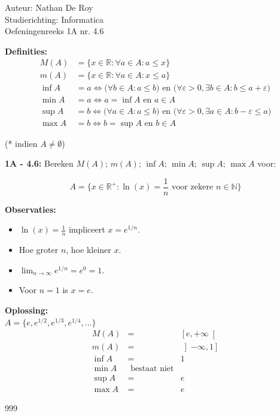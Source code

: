 \documentclass[a4paper]{article}
\begin{document}
\noindent \large Auteur: Nathan De Roy \\
\noindent \large Studierichting: Informatica \\
\noindent \large Oefeningenreeks 1A nr. 4.6 \\

\medskip
\normalsize

\textbf{Definities:}
\begin{align*}
    M(A) &= \{x \in \mathbb{R} : \forall a \in A : a \leq x\} \\
    m(A) &= \{x \in \mathbb{R} : \forall a \in A : x \leq a\} \\
    \inf A &= a \Leftrightarrow 
        \big( \forall b \in A : a \leq b \big) 
        \text{ en } 
        \big( \forall \varepsilon > 0, \exists b \in A : b \leq a + \varepsilon \big) \\
    \min A &= a \Leftrightarrow a = \inf A \text{ en } a \in A \\
    \sup A &= b \Leftrightarrow 
        \big( \forall a \in A : a \leq b \big) 
        \text{ en } 
        \big( \forall \varepsilon > 0, \exists a \in A : b - \varepsilon \leq a \big) \\
    \max A &= b \Leftrightarrow b = \sup A \text{ en } b \in A
\end{align*}

\noindent (* indien $A \neq \emptyset$)

\bigskip

\textbf{1A - 4.6:} Bereken $M(A)$; $m(A)$; $\inf A$; $\min A$; $\sup A$; $\max A$ voor:

\[
A = \{ x \in \mathbb{R}^+ : \ln(x) = \dfrac{1}{n}
\text{ voor zekere } n \in \mathbb{N} \}
\]

\textbf{Observaties:}
\begin{itemize}
    \item $\ln(x) = \frac{1}{n}$ impliceert $x = e^{1/n}$.
    \item Hoe groter $n$, hoe kleiner $x$.
    \item $\displaystyle \lim_{n \to \infty} e^{1/n} = e^0 = 1$.
    \item Voor $n = 1$ is $x = e$.
\end{itemize}

\textbf{Oplossing:}\\

$A = \{e, e^{1/2}, e^{1/3}, e^{1/4}, \dots\}$\\

\begin{eqnarray*}
M(A) & = & \left[ e, +\infty \right[ \\
m(A) & = & \left] -\infty, 1 \right] \\
\inf A & = & 1 \\
\min A & \text{ bestaat niet} &  \\
\sup A & = &  e \\
\max A & = & e
\end{eqnarray*}

\begin{thebibliography}{999}
\end{thebibliography}
\end{document}
